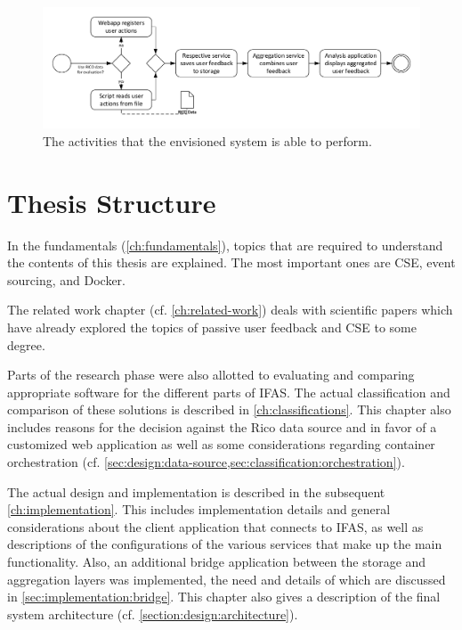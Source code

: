 \begin{figure}[ht]
        \includegraphics[width=1.1\textwidth]{gfx/architecture-3.pdf}
        \caption{The activities that the envisioned system is able to perform.}
        \label{fig:system:vision}
\end{figure}


\section{Thesis Structure}
\label{sec:intro:structure}

In the fundamentals (\cref{ch:fundamentals}), topics that are required to understand the contents of this thesis are explained.
The most important ones are \acf{CSE}, event sourcing, and Docker.

The related work chapter (cf. \cref{ch:related-work}) deals with scientific papers which have already explored the topics of passive user feedback and \ac{CSE} to some degree.

Parts of the research phase were also allotted to evaluating and comparing appropriate software for the different parts of \ac{IFAS}.
The actual classification and comparison of these solutions is described in \cref{ch:classifications}.
This chapter also includes reasons for the decision against the Rico data source and in favor of a customized web application as well as some considerations regarding container orchestration (cf. \cref{sec:design:data-source,sec:classification:orchestration}).

The actual design and implementation is described in the subsequent \cref{ch:implementation}.
This includes implementation details and general considerations about the client application that connects to \ac{IFAS}, as well as descriptions of the configurations of the various services that make up the main functionality.
Also, an additional bridge application between the storage and aggregation layers was implemented, the need and details of which are discussed in \cref{sec:implementation:bridge}.
This chapter also gives a description of the final system architecture (cf. \cref{section:design:architecture}).

